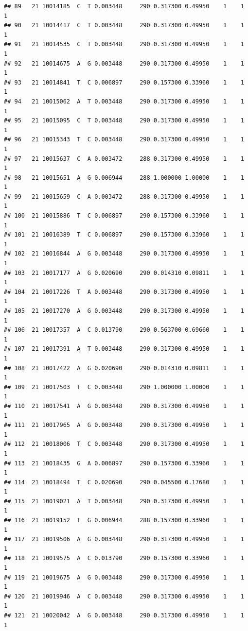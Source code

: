 \documentclass[
]{article}
\begin{document}
\begin{verbatim}
## 89   21 10014185  C  T 0.003448     290 0.317300 0.49950    1    1        1
## 90   21 10014417  C  T 0.003448     290 0.317300 0.49950    1    1        1
## 91   21 10014535  C  T 0.003448     290 0.317300 0.49950    1    1        1
## 92   21 10014675  A  G 0.003448     290 0.317300 0.49950    1    1        1
## 93   21 10014841  T  C 0.006897     290 0.157300 0.33960    1    1        1
## 94   21 10015062  A  T 0.003448     290 0.317300 0.49950    1    1        1
## 95   21 10015095  C  T 0.003448     290 0.317300 0.49950    1    1        1
## 96   21 10015343  T  C 0.003448     290 0.317300 0.49950    1    1        1
## 97   21 10015637  C  A 0.003472     288 0.317300 0.49950    1    1        1
## 98   21 10015651  A  G 0.006944     288 1.000000 1.00000    1    1        1
## 99   21 10015659  C  A 0.003472     288 0.317300 0.49950    1    1        1
## 100  21 10015886  T  C 0.006897     290 0.157300 0.33960    1    1        1
## 101  21 10016389  T  C 0.006897     290 0.157300 0.33960    1    1        1
## 102  21 10016844  A  G 0.003448     290 0.317300 0.49950    1    1        1
## 103  21 10017177  A  G 0.020690     290 0.014310 0.09811    1    1        1
## 104  21 10017226  T  A 0.003448     290 0.317300 0.49950    1    1        1
## 105  21 10017270  A  G 0.003448     290 0.317300 0.49950    1    1        1
## 106  21 10017357  A  C 0.013790     290 0.563700 0.69660    1    1        1
## 107  21 10017391  A  T 0.003448     290 0.317300 0.49950    1    1        1
## 108  21 10017422  A  G 0.020690     290 0.014310 0.09811    1    1        1
## 109  21 10017503  T  C 0.003448     290 1.000000 1.00000    1    1        1
## 110  21 10017541  A  G 0.003448     290 0.317300 0.49950    1    1        1
## 111  21 10017965  A  G 0.003448     290 0.317300 0.49950    1    1        1
## 112  21 10018006  T  C 0.003448     290 0.317300 0.49950    1    1        1
## 113  21 10018435  G  A 0.006897     290 0.157300 0.33960    1    1        1
## 114  21 10018494  T  C 0.020690     290 0.045500 0.17680    1    1        1
## 115  21 10019021  A  T 0.003448     290 0.317300 0.49950    1    1        1
## 116  21 10019152  T  G 0.006944     288 0.157300 0.33960    1    1        1
## 117  21 10019506  A  G 0.003448     290 0.317300 0.49950    1    1        1
## 118  21 10019575  A  C 0.013790     290 0.157300 0.33960    1    1        1
## 119  21 10019675  A  G 0.003448     290 0.317300 0.49950    1    1        1
## 120  21 10019946  A  C 0.003448     290 0.317300 0.49950    1    1        1
## 121  21 10020042  A  G 0.003448     290 0.317300 0.49950    1    1        1

\end{verbatim}
\end{document}
